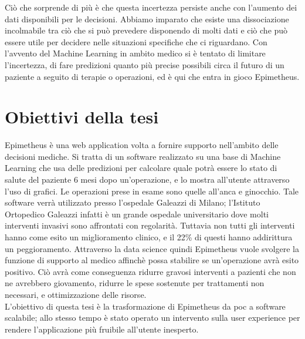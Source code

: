 Ciò che sorprende di più è che questa incertezza persiste anche con l'aumento dei dati disponibili per le decisioni. Abbiamo imparato che esiste una dissociazione incolmabile tra ciò che si può prevedere disponendo di molti dati e ciò che può essere utile per decidere nelle situazioni specifiche che ci riguardano. 
Con l'avvento del Machine Learning in ambito medico si è tentato di limitare l'incertezza, di fare predizioni quanto più precise possibili circa il futuro di un paziente a seguito di terapie o operazioni, ed è qui che entra in gioco Epimetheus.\\

\section{Obiettivi della tesi}
Epimetheus è una web application volta a fornire supporto nell'ambito delle decisioni mediche. Si tratta di un software realizzato su una base di Machine Learning che usa delle  predizioni per calcolare quale potrà essere lo stato di salute del paziente 6 mesi dopo un'operazione, e lo mostra all'utente attraverso l'uso di grafici. Le operazioni prese in esame sono quelle all'anca e ginocchio. Tale software verrà utilizzato presso l'ospedale Galeazzi di Milano; l'Istituto Ortopedico Galeazzi infatti è un grande ospedale universitario dove molti interventi invasivi sono affrontati con regolarità. Tuttavia non tutti gli interventi hanno come esito un miglioramento clinico, e il 22\% di questi hanno addirittura un peggioramento. 
Attraverso la data science quindi Epimetheus vuole svolgere la funzione di supporto al medico affinchè possa stabilire se un'operazione avrà esito positivo. Ciò avrà come conseguenza ridurre gravosi interventi a pazienti che non ne avrebbero giovamento, ridurre le spese sostenute per trattamenti non necessari, e ottimizzazione delle risorse. \\

L'obiettivo di questa tesi è la trasformazione di Epimetheus da \gls{poc} a software scalabile; allo stesso tempo è stato operato un intervento sulla user experience per rendere l'applicazione più fruibile all'utente inesperto.


